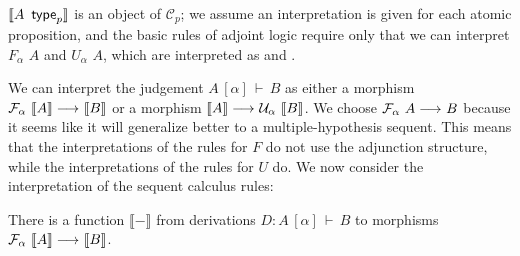 \documentclass{drl-common/llncs}
\renewcommand{\sem}[1]{\ensuremath{ \llbracket #1 \rrbracket}}
\newcommand{\C}{\ensuremath{\mathcal{C}}}
\newcommand{\arrow}[3]{\ensuremath{#2 \longrightarrow_{#1} #3}}
\renewcommand\wftp[2]{\ensuremath{#1 \,\,\, \dsd{type}_{#2}}}
\newcommand\F[2]{\ensuremath{F_{#1} \,\, #2}}
\newcommand\U[2]{\ensuremath{U_{#1} \,\, #2}}
\newcommand\seq[3]{\ensuremath{#1 \, [ #2 ] \, \vdash \, #3}}
\begin{document}
\sem{\wftp{A}{p}} is an object of $\C_p$; we assume an interpretation is
given for each atomic proposition, and the basic rules of adjoint logic
require only that we can interpret \F{\alpha}{A} and \U{\alpha}{A},
which are interpreted as \semF{\alpha}{\sem{A}} and
\semU{\alpha}{\sem{A}}.

We can interpret the judgement \seq{A}{\alpha}{B} as either a morphism
$\arrow{}{\semF \alpha {\sem A}}{\sem B}$ or a morphism $\arrow{}{\sem
  A}{\semU \alpha {\sem B}}$.  We choose $\arrow{}{\semF \alpha A}{B}$
because it seems like it will generalize better to a multiple-hypothesis
sequent.  This means that the interpretations of the rules for $F$ do
not use the adjunction structure, while the interpretations of the rules
for $U$ do.  We now consider the interpretation of the sequent calculus
rules:

\begin{theorem}  \label{thm:semsequent}
There is a function \sem{-} from derivations $D : \seq{A}{\alpha}{B}$ 
to morphisms \arrow{}{\semF \alpha {\sem A}}{\sem B}.
\end{theorem}
\end{document}
